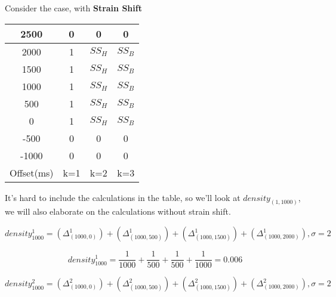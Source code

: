 \documentclass{article}
\begin{document}
Consider the case, with \textbf{Strain Shift}
\begin{center}
	\begin{tabular}{|c|c|c|c|} 
	\hline
	2500 & 0 & 0 		& 0 	\\ \hline
	2000 & 1 & $SS_H$ 	& $SS_B$\\	\hline
	1500 & 1 & $SS_H$ 	& $SS_B$\\	\hline
	1000 & 1 & $SS_H$ 	& $SS_B$\\	\hline
	 500 & 1 & $SS_H$ 	& $SS_B$\\	\hline
	   0 & 1 & $SS_H$ 	& $SS_B$\\	\hline
    -500 & 0 & 0 		& 0 	\\	\hline
   -1000 & 0 & 0 		& 0 	\\
	\hline
	Offset(ms) & k=1 & k=2 & k=3\\ 
	\hline
\end{tabular}
\end{center}

It's hard to include the calculations in the table, so we'll look at $density_{(1,1000)}$, we will also elaborate on the calculations without strain shift.

$$density_{1000}^1 =
(\Delta_{(1000,0)}^{1}) +
(\Delta_{(1000,500)}^{1}) +
(\Delta_{(1000,1500)}^{1}) +
(\Delta_{(1000,2000)}^{1}), \sigma = 2$$

$$density_{1000}^1 =
\frac{1}{1000} +
\frac{1}{500} +
\frac{1}{500} +
\frac{1}{1000} = 0.006$$

$$density_{1000}^2 = 
(\Delta_{(1000,0)}^{2}) +
(\Delta_{(1000,500)}^{2}) +
(\Delta_{(1000,1500)}^{2}) +
(\Delta_{(1000,2000)}^{2}), \sigma = 2$$
\end{document}
